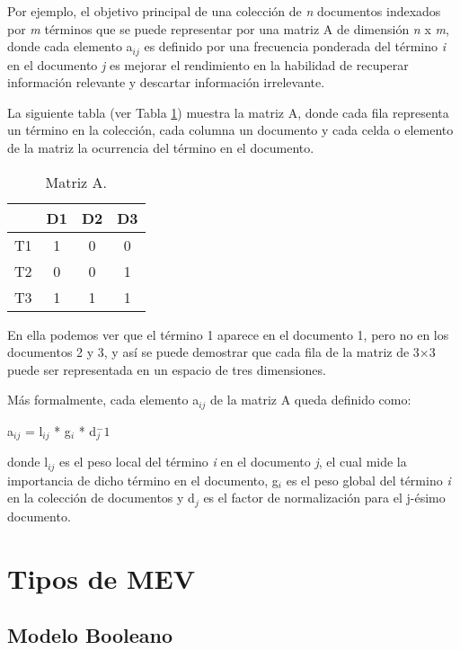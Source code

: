 \documentclass{article}
\begin{document}
Por ejemplo, el objetivo principal de una colección de \textit{n} documentos indexados por \textit{m} términos que se puede representar por una matriz A de dimensión \textit{n} x \textit{m}, donde cada elemento a$_{ij}$ es definido por una frecuencia ponderada del término \textit{i} en el documento \textit{j} es mejorar el rendimiento en la habilidad de recuperar información relevante y descartar información irrelevante. 

La siguiente tabla (ver Tabla \ref{table: Table 1}) muestra la matriz A, donde cada fila representa un término en la colección, cada columna un documento y cada celda o elemento de la matriz la ocurrencia del término en el documento.

\begin{table}[h]
	\begin{center}
		\begin{tabular}{ |c|c|c|c| }
			\hline 
			& D1 & D2 & D3 \\
			\hline
			T1 & 1 & 0 & 0 \\ 
			\hline
			T2 & 0 & 0	& 1 \\ 
			\hline
			T3 & 1 & 1	& 1 \\
			\hline
		\end{tabular}
		\caption{Matriz A.}
		\label{table: Table 1}
	\end{center}
\end{table}

En ella podemos ver que el término 1 aparece en el documento 1, pero no en los documentos 2 y 3, y así se puede demostrar que cada fila de la matriz de 3×3 puede ser representada en un espacio de tres dimensiones.

Más formalmente, cada elemento a$_{ij}$ de la matriz A queda definido como: 

\begin{center}
	a$_{ij}$ = l$_{ij}$ * g$_{i}$ * d$_{j}^-1$
\end{center}

donde l$_{ij}$ es el peso local del término \textit{i} en el documento \textit{j}, el cual mide la importancia de dicho término en el documento, g$_{i}$ es el peso global del término \textit{i} en la colección de documentos y d$_{j}$ es el factor de normalización para el j-ésimo documento. 

\section{Tipos de MEV}

\subsection{Modelo Booleano}
\end{document}
